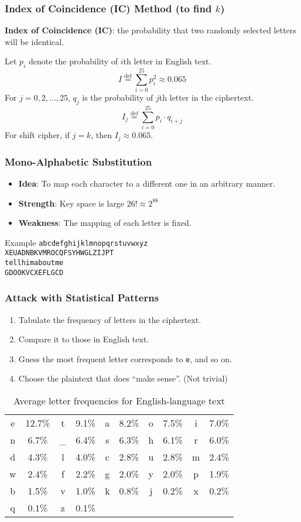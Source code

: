 \begin{frame}\frametitle{Index of Coincidence (IC) Method (to find $k$)}
\textbf{Index of Coincidence (IC)}: the probability that two randomly selected letters will be identical.

Let $p_i$ denote the probability of $i$th letter in English text.
\[I \overset{\text{def}}{=}\sum_{i=0}^{25} p_i^2 \approx 0.065\]
For $j = 0, 2, \dotsc , 25$, $q_j$ is the probability of $j$th letter in the ciphertext.
\[I_j \overset{\text{def}}{=}\sum_{i=0}^{25} p_i \cdot q_{i+j}\]
For shift cipher, \alert{if $j = k$, then $I_j \approx 0.065$}.
\end{frame}
\begin{frame}[fragile]\frametitle{Mono-Alphabetic Substitution}
\begin{itemize}
\item \textbf{Idea}: To map each character to a different one in an arbitrary manner.
\item \textbf{Strength}: Key space is large $26! \approx 2^{88}$\\
\item \textbf{Weakness}: The mapping of each letter is fixed.
\end{itemize}
\begin{exampleblock}{Example}
\verb|abcdefghijklmnopqrstuvwxyz|\\
\verb|XEUADNBKVMROCQFSYHWGLZIJPT|\\

\verb|tellhimaboutme|\\
\verb|GDOOKVCXEFLGCD|
\end{exampleblock}
\end{frame}
\begin{frame}[fragile]\frametitle{Attack with Statistical Patterns}
\begin{enumerate}
\item Tabulate the frequency of letters in the ciphertext.
\item Compare it to those in English text.
\item Guess the most frequent letter corresponds to \verb|e|, and so on.
\item Choose the plaintext that does ``make sense''. (Not trivial)
\end{enumerate}
\begin{table}
\begin{center}
\caption{Average letter frequencies for English-language text}
\begin{tabular}{|cc|cc|cc|cc|cc|} \hline
e & 12.7\% & t & 9.1\% & a & 8.2\% & o & 7.5\% & i & 7.0\%\\
n & 6.7\% & \_ & 6.4\% & s & 6.3\% & h & 6.1\% & r & 6.0\%\\
d & 4.3\% & l & 4.0\% & c & 2.8\% & u & 2.8\% & m & 2.4\%\\
w & 2.4\% & f & 2.2\% & g & 2.0\% & y & 2.0\% & p & 1.9\%\\
b & 1.5\% & v & 1.0\% & k & 0.8\% & j & 0.2\% & x & 0.2\%\\
q & 0.1\% & z & 0.1\% & & & & & &\\ \hline
\end{tabular}
\end{center}
\end{table}
\end{frame}
